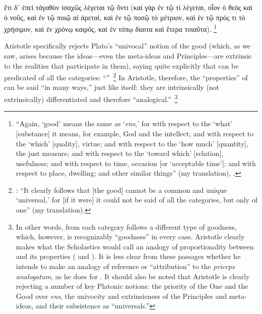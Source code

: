 {\begin{greekQuotation}
ἔτι δ᾽ ἐπεὶ τἀγαθὸν ἰσαχῶς λέγεται τῷ ὄντι (καὶ γὰρ ἐν τῷ τί λέγεται, οἷον ὁ θεὸς καὶ ὁ νοῦς, καὶ ἐν τῷ ποιῷ αἱ ἀρεταί, καὶ ἐν τῷ ποσῷ τὸ μέτριον, καὶ ἐν τῷ πρός τι τὸ χρήσιμον, καὶ ἐν χρόνῳ καιρός, καὶ ἐν τόπῳ δίαιτα καὶ ἕτερα τοιαῦτα).%
%
\footnote{\enquote{Again, \enquote{good} means the same as \enquote{\emph{ens},} for with respect to the \enquote{what} [substance] it means, for example, God and the intellect; and with respect to the \enquote{which} [quality], virtue; and with respect to the \enquote{how much} [quantity], the just measure; and with respect to the \enquote{toward which} [relation], usefulness; and with respect to time, occasion [or \enquote{acceptable time}]; and with respect to place, dwelling; and other similar things} (my translation), \cite[, 1, 1096a24-26]{aristotle:ethics}.}
%
\end{greekQuotation}
%
Aristotle specifically rejects Plato's \enquote{univocal} notion of the good (which, as we saw, arises because the ideas---even the meta-ideas and Principles---are extrinsic to the realities that participate in them), saying quite explicitly that  can be predicated of all the categories: \enquote{}\,%
%
\footnote{\Cite[, 1, 1096a28-30]{aristotle:ethics}: \enquote{It clearly follows that [the good] cannot be a common and unique \enquote{universal,} for [if it were] it could not be said of all the categories, but only of one} (my translation).}
%
In Aristotle, therefore, the \enquote{properties} of  can be said \enquote{in many ways,} just like  itself: they are intrinsically (not extrinsically) differentiated and therefore \enquote{analogical.}\,%
%
\footnote{In other words, from each category follows a different type of goodness, which, however, is recognizably \enquote{goodness} in every case. Aristotle clearly makes what the Scholastics would call an analogy of proportionality between  and its properties ( and ). It is less clear from these passages whether he intends to make an analogy of reference or \enquote{attribution} to the \emph{priceps analogatum}, as he does for . It should also be noted that Aristotle is clearly rejecting a number of key Platonic notions: the priority of the One and the Good over \emph{ens}, the univocity and extrinsicness of the Principles and meta-ideas, and their  subsistence as \enquote{universals.}

}}
